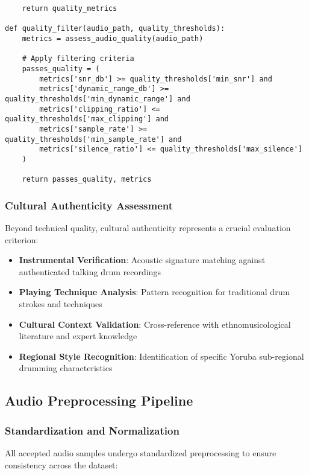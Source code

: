 \documentclass[12pt]{article}
\begin{document}
\begin{verbatim}
    return quality_metrics

def quality_filter(audio_path, quality_thresholds):
    metrics = assess_audio_quality(audio_path)
    
    # Apply filtering criteria
    passes_quality = (
        metrics['snr_db'] >= quality_thresholds['min_snr'] and
        metrics['dynamic_range_db'] >= quality_thresholds['min_dynamic_range'] and
        metrics['clipping_ratio'] <= quality_thresholds['max_clipping'] and
        metrics['sample_rate'] >= quality_thresholds['min_sample_rate'] and
        metrics['silence_ratio'] <= quality_thresholds['max_silence']
    )
    
    return passes_quality, metrics
\end{verbatim}

\subsubsection{Cultural Authenticity Assessment}
Beyond technical quality, cultural authenticity represents a crucial evaluation criterion:

\begin{itemize}
    \item \textbf{Instrumental Verification}: Acoustic signature matching against authenticated talking drum recordings
    \item \textbf{Playing Technique Analysis}: Pattern recognition for traditional drum strokes and techniques
    \item \textbf{Cultural Context Validation}: Cross-reference with ethnomusicological literature and expert knowledge
    \item \textbf{Regional Style Recognition}: Identification of specific Yoruba sub-regional drumming characteristics
\end{itemize}

\subsection{Audio Preprocessing Pipeline}

\subsubsection{Standardization and Normalization}
All accepted audio samples undergo standardized preprocessing to ensure consistency across the dataset:
\end{document}
